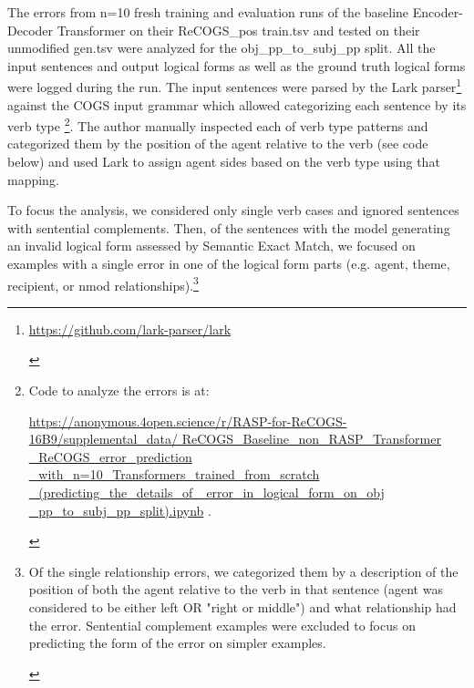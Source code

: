 \documentclass[11pt]{article}
\begin{document}
The errors from n=10 fresh training and evaluation runs of the baseline \cite{Wu2023} Encoder-Decoder Transformer on their ReCOGS\_pos train.tsv and tested on their unmodified gen.tsv were analyzed for the obj\_pp\_to\_subj\_pp split. All the input sentences and output logical forms as well as the ground truth logical forms were logged during the run. The input sentences were parsed by the Lark parser\footnote{\begin{footnotesize}\href{https://github.com/lark-parser/lark}{https://github.com/lark-parser/lark}\end{footnotesize}} against the COGS input grammar which allowed categorizing each sentence by its verb type \footnote{\begin{footnotesize}Code to analyze the errors is at: 

\href{https://anonymous.4open.science/r/RASP-for-ReCOGS-16B9/supplemental_data/ReCOGS_Baseline_non_RASP_Transformer_ReCOGS_error_prediction_with_n=10_Transformers_trained_from_scratch_(predicting_the_details_of_error_in_logical_form_on_obj_pp_to_subj_pp_split).ipynb}{https://anonymous.4open.science/r/RASP-for-ReCOGS-16B9/supplemental\_data/
ReCOGS\_Baseline\_non\_RASP\_Transformer
\_ReCOGS\_error\_prediction
\_with\_n=10\_Transformers\_trained\_from\_scratch
\_(predicting\_the\_details\_of
\_error\_in\_logical\_form\_on\_obj
\_pp\_to\_subj\_pp\_split).ipynb} .\end{footnotesize}}. The author manually inspected each of verb type patterns and categorized them by the position of the agent relative to the verb (see code below) and used Lark to assign agent sides based on the verb type using that mapping.

To focus the analysis, we considered only single verb cases and ignored sentences with sentential complements. Then, of the sentences with the model generating an invalid logical form assessed by Semantic Exact Match, we focused on examples with a single error in one of the logical form parts (e.g. agent, theme, recipient, or nmod relationships).\footnote{\begin{footnotesize}Of the single relationship errors, we categorized them by a description of the position of both the agent relative to the verb in that sentence (agent was considered to be either left OR "right or middle") and what relationship had the error. Sentential complement examples were excluded to focus on predicting the form of the error on simpler examples.\end{footnotesize}}
\end{document}
